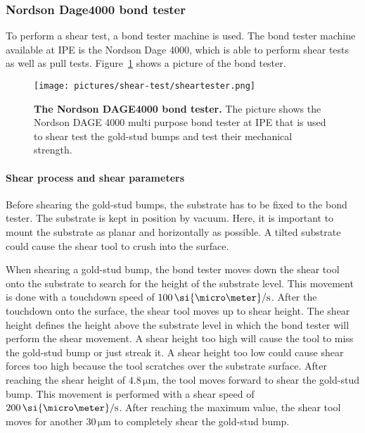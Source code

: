 \subsubsection{Nordson Dage4000 bond tester}
To perform a shear test, a bond tester machine is used. The bond tester machine available at \ac{IPE} is the Nordson Dage 4000, which is able to perform shear tests as well as pull tests. Figure~\ref{pic:shear_tester} shows a picture of the bond tester.
\begin{figure}
\begin{center}
\texttt{[image: pictures/shear-test/sheartester.png]}
\end{center}
\caption[The Nordson DAGE 4000 bond tester]{\textbf{The Nordson DAGE4000 bond tester.} The picture shows the Nordson DAGE 4000 multi purpose bond tester at \ac{IPE} that is used to shear test the gold-stud bumps and test their mechanical strength.}\label{pic:shear_tester}
\end{figure}

\paragraph*{Shear process and shear parameters}
Before shearing the gold-stud bumps, the substrate has to be fixed to the bond tester. The substrate is kept in position by vacuum. Here, it is important to mount the substrate as planar and horizontally as possible. A tilted substrate could cause the shear tool to crush into the surface.

When shearing a gold-stud bump, the bond tester moves down the shear tool onto the substrate to search for the height of the substrate level. This movement is done with a touchdown speed of $100\,\si{\micro \meter}/\rm{s}$. After the touchdown onto the surface, the shear tool moves up to shear height. The shear height defines the height above the substrate level in which the bond tester will perform the shear movement. A shear height too high will cause the tool to miss the gold-stud bump or just streak it. A shear height too low could cause shear forces too high because the tool scratches over the substrate surface. After reaching the shear height of $4.8\,\si{\micro \meter}$, the tool moves forward to shear the gold-stud bump. This movement is performed with a shear speed of $200\,\si{\micro \meter}/\rm{s}$. After reaching the maximum value, the shear tool moves for another $30\,\si{\micro \meter}$ to completely shear the gold-stud bump.

